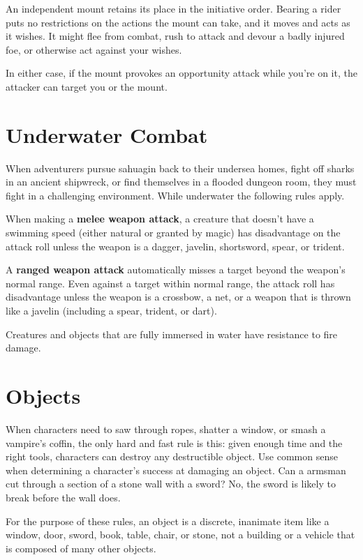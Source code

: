 An independent mount retains its place in the initiative order. Bearing a rider puts no restrictions on the actions the mount can take, and it moves and acts as it wishes. It might flee from combat, rush to attack and devour a badly injured foe, or otherwise act against your wishes.

In either case, if the mount provokes an opportunity attack while you're on it, the attacker can target you or the mount.

\section{Underwater Combat}

When adventurers pursue sahuagin back to their undersea homes, fight off sharks in an ancient shipwreck, or find themselves in a flooded dungeon room, they must fight in a challenging environment. While underwater the following rules apply.

When making a \textbf{melee weapon attack}, a creature that doesn't have a swimming speed (either natural or granted by magic) has disadvantage on the attack roll unless the weapon is a dagger, javelin, shortsword, spear, or trident.

A \textbf{ranged weapon attack} automatically misses a target beyond the weapon's normal range. Even against a target within normal range, the attack roll has disadvantage unless the weapon is a crossbow, a net, or a weapon that is thrown like a javelin (including a spear, trident, or dart).

Creatures and objects that are fully immersed in water have resistance to fire damage.

\section{Objects}

When characters need to saw through ropes, shatter a window, or smash a vampire's coffin, the only hard and fast rule is this: given enough time and the right tools, characters can destroy any destructible object. Use common sense when determining a character's success at damaging an object. Can a armsman cut through a section of a stone wall with a sword? No, the sword is likely to break before the wall does.

For the purpose of these rules, an object is a discrete, inanimate item like a window, door, sword, book, table, chair, or stone, not a building or a vehicle that is composed of many other objects.

